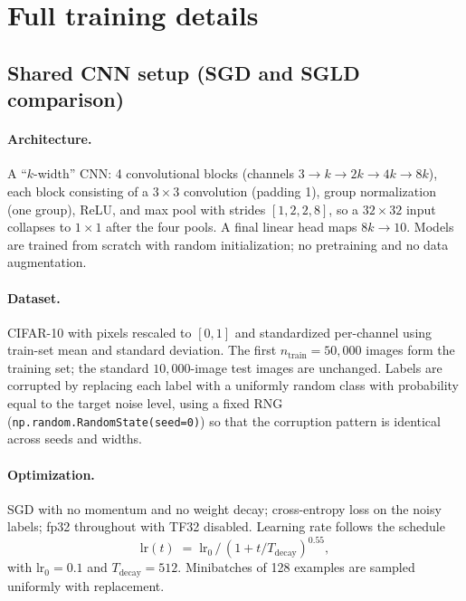 
\section{Full training details}
\label{app:training}

\subsection{Shared CNN setup (SGD and SGLD comparison)}

\paragraph{Architecture.}
A ``$k$-width'' CNN: 4 convolutional blocks (channels $3 \to k \to 2k \to 4k
\to 8k$), each block consisting of a $3\times 3$ convolution (padding 1),
group normalization (one group), ReLU, and max pool with strides $[1, 2, 2, 8]$, so a
$32\times 32$ input collapses to $1\times 1$ after the four pools. A final
linear head maps $8k \to 10$. Models are trained from scratch with random
initialization; no pretraining and no data augmentation.

\paragraph{Dataset.}
CIFAR-10 with pixels rescaled to $[0,1]$ and standardized per-channel
using train-set mean and standard deviation. The first $n_{\mathrm{train}}
= 50{,}000$ images form the training set; the standard $10{,}000$-image
test images are unchanged. Labels are corrupted by replacing each label
with a uniformly random class with probability equal to the target noise
level, using a fixed RNG (\texttt{np.random.RandomState(seed=0)}) so that
the corruption pattern is identical across seeds and widths.

\paragraph{Optimization.}
SGD with no momentum and no weight decay; cross-entropy loss on the noisy
labels; fp32 throughout with TF32 disabled. Learning rate follows the
schedule
\[
\mathrm{lr}(t) \;=\; \mathrm{lr}_0 \,/\, (1 + t/T_{\mathrm{decay}})^{0.55},
\]
with $\mathrm{lr}_0 = 0.1$ and $T_{\mathrm{decay}} = 512$.
Minibatches of 128 examples are sampled uniformly with replacement.

